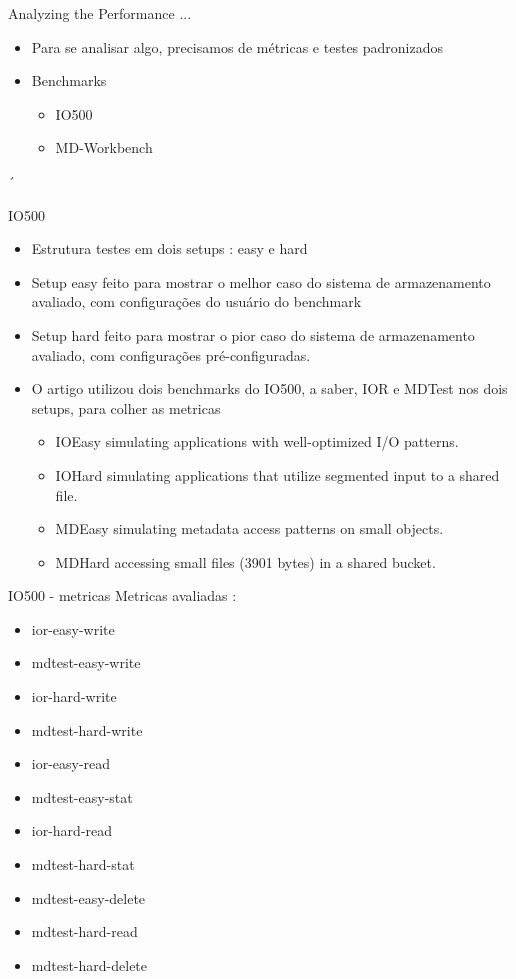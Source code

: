 \documentclass{beamer}
\begin{document}
\begin{frame}{Analyzing the Performance ...}
	\begin{itemize}
		\item Para se analisar algo, precisamos de métricas e testes padronizados
		\pause
		\item Benchmarks
		\begin{itemize}
			\item IO500
			\item MD-Workbench
		\end{itemize}
	\end{itemize}
´\end{frame}
\begin{frame}{IO500}
	\begin{itemize}
		\item Estrutura testes em dois setups : easy e hard
		\item Setup easy feito para mostrar o melhor caso do sistema de armazenamento avaliado, com configurações do usuário do benchmark
		\item Setup hard feito para mostrar o pior caso do sistema de armazenamento avaliado, com configurações pré-configuradas.
		\item O artigo utilizou dois benchmarks do IO500, a saber, IOR e MDTest nos dois setups, para colher as metricas
		\begin{itemize}
			\item IOEasy simulating applications with well-optimized I/O patterns.
			\item IOHard simulating applications that utilize segmented input to a shared file.
			\item MDEasy simulating metadata access patterns on small objects.
			\item MDHard accessing small files (3901 bytes) in a shared bucket.
		\end{itemize}
		\end{itemize}
	\end{frame}
\begin{frame}{IO500 - metricas}
	Metricas avaliadas : 
		\begin{itemize}
			\item ior-easy-write
			\item mdtest-easy-write
			\item ior-hard-write
			\item mdtest-hard-write
			\item ior-easy-read
			\item mdtest-easy-stat
			\item ior-hard-read
			\item mdtest-hard-stat
			\item mdtest-easy-delete
			\item mdtest-hard-read
			\item mdtest-hard-delete
		\end{itemize}

\end{frame}
\end{document}
